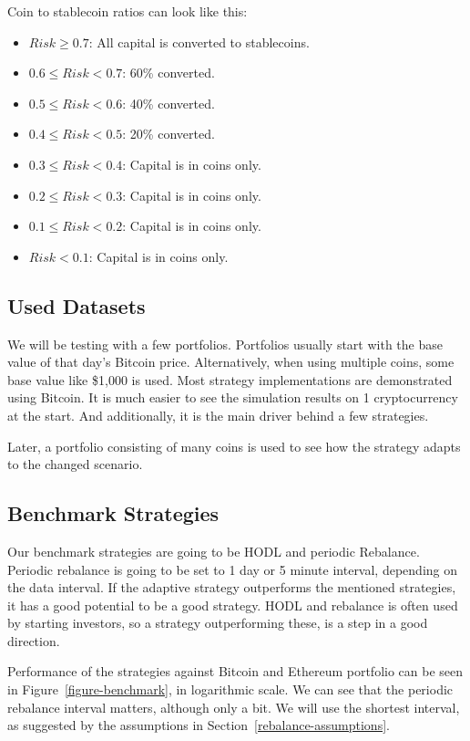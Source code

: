 Coin to stablecoin ratios can look like this:
\begin{itemize}
    \item $Risk \ge  0.7$: All capital is converted to stablecoins.
    \item $0.6 \le Risk < 0.7$: 60\% converted.
    \item $0.5 \le Risk < 0.6$: 40\% converted.
    \item $0.4 \le Risk < 0.5$: 20\% converted.
    \item $0.3 \le Risk < 0.4$: Capital is in coins only.
    \item $0.2 \le Risk < 0.3$: Capital is in coins only.
    \item $0.1 \le Risk < 0.2$: Capital is in coins only.
    \item $Risk < 0.1$: Capital is in coins only.
\end{itemize}


\subsection*{Used Datasets}
We will be testing with a few portfolios. Portfolios usually start with the base value of that day's Bitcoin price. Alternatively, when using multiple coins, some base value like \$1,000 is used. Most strategy implementations are demonstrated using Bitcoin. It is much easier to see the simulation results on 1 cryptocurrency at the start. And additionally, it is the main driver behind a few strategies.

Later, a portfolio consisting of many coins is used to see how the strategy adapts to the changed scenario.


\subsection*{Benchmark Strategies}
Our benchmark strategies are going to be HODL and periodic Rebalance. Periodic rebalance is going to be set to 1 day or 5 minute interval, depending on the data interval. If the adaptive strategy outperforms the mentioned strategies, it has a good potential to be a good strategy. HODL and rebalance is often used by starting investors, so a strategy outperforming these, is a step in a good direction.

Performance of the strategies against Bitcoin and Ethereum portfolio can be seen in Figure~\ref{figure-benchmark}, in logarithmic scale. We can see that the periodic rebalance interval matters, although only a bit. We will use the shortest interval, as suggested by the assumptions in Section~\ref{rebalance-assumptions}.

